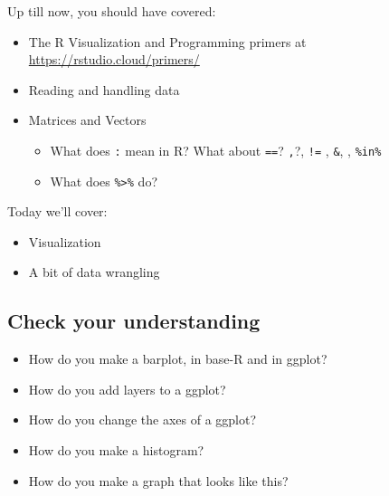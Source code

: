 \documentclass[]{book}
\newenvironment{Shaded}{\begin{snugshade}}{\end{snugshade}}
\providecommand{\tightlist}{%
  \setlength{\itemsep}{0pt}\setlength{\parskip}{0pt}}
\theoremstyle{definition}
\theoremstyle{definition}
\theoremstyle{definition}
\theoremstyle{remark}
\begin{document}
\begin{Shaded}
\begin{Highlighting}[]
\begin{Shaded}
\begin{Highlighting}[]
Up till now, you should have covered:

\begin{itemize}
\tightlist
\item
  The R Visualization and Programming primers at \url{https://rstudio.cloud/primers/}
\item
  Reading and handling data
\item
  Matrices and Vectors

  \begin{itemize}
  \tightlist
  \item
    What does \texttt{:} mean in R? What about \texttt{==}? \texttt{,}?, \texttt{!=} , \texttt{\&}, \texttt{\textbar{}}, \texttt{\%in\%}
  \item
    What does \texttt{\%\textgreater{}\%} do?
  \end{itemize}
\end{itemize}

Today we'll cover:

\begin{itemize}
\tightlist
\item
  Visualization
\item
  A bit of data wrangling
\end{itemize}

\hypertarget{check-your-understanding-1}{%
\subsection*{Check your understanding}\label{check-your-understanding-1}}

\begin{itemize}
\tightlist
\item
  How do you make a barplot, in base-R and in ggplot?
\item
  How do you add layers to a ggplot?
\item
  How do you change the axes of a ggplot?
\item
  How do you make a histogram?
\item
  How do you make a graph that looks like this?
\end{itemize}


\end{Highlighting}
\end{Shaded}
\end{Highlighting}
\end{Shaded}
\end{document}
